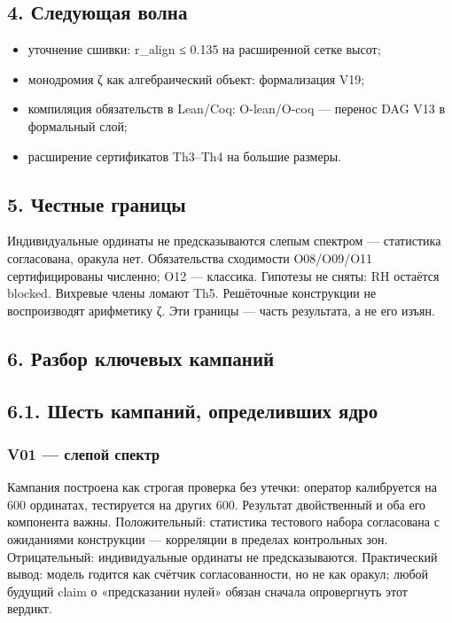 \documentclass[11pt,a4paper]{article}
\begin{document}
\subsection{4. Следующая волна}

\begin{itemize}
  \item уточнение сшивки: r\_align ≤ 0.135 на расширенной сетке высот;
  \item монодромия ζ как алгебраический объект: формализация V19;
  \item компиляция обязательств в Lean/Coq: O-lean/O-coq — перенос DAG V13 в формальный слой;
  \item расширение сертификатов Th3–Th4 на большие размеры.
\end{itemize}

\subsection{5. Честные границы}

Индивидуальные ординаты не предсказываются слепым спектром — статистика согласована, оракула нет. Обязательства сходимости O08/O09/O11 сертифицированы численно; O12 — классика. Гипотезы не сняты: RH остаётся blocked. Вихревые члены ломают Th5. Решёточные конструкции не воспроизводят арифметику ζ. Эти границы — часть результата, а не его изъян.

\subsection{6. Разбор ключевых кампаний}

\subsection{6.1. Шесть кампаний, определивших ядро}

\subsubsection{V01 — слепой спектр}

Кампания построена как строгая проверка без утечки: оператор калибруется на 600 ординатах, тестируется на других 600. Результат двойственный и оба его компонента важны. Положительный: статистика тестового набора согласована с ожиданиями конструкции — корреляции в пределах контрольных зон. Отрицательный: индивидуальные ординаты не предсказываются. Практический вывод: модель годится как счётчик согласованности, но не как оракул; любой будущий claim о «предсказании нулей» обязан сначала опровергнуть этот вердикт.
\end{document}
